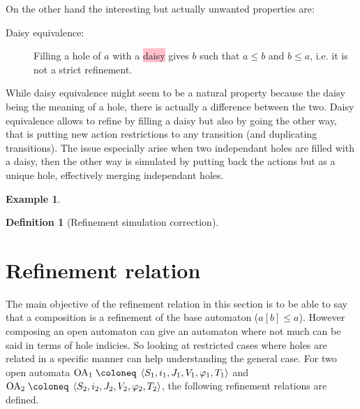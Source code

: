 \documentclass{article}
\theoremstyle{plain}
\theoremstyle{definition}
\newtheorem{defi}{Definition}
\newtheorem{exi}{Example}
\newcommand\comment[3]{\colorbox{#1}{#2}\marginpar{#3}}
\newcommand\Quentin{\comment{pink}}
\newcommand\mbrk[1]{{\left[#1\right]}}
\newcommand\defobject{\DOTSB\;{\coloneq}\;}
\newcommand\OA[6]{\left<#1,#2,#3,#4,#5,#6\right>}
\begin{document}
On the other hand the interesting but actually unwanted properties are:
\begin{description}
\item[Daisy equivalence:] Filling a hole of \(a\) with a \Quentin{daisy}{How is it called in english?} gives \(b\) such that \(a \leq b\) and \(b \leq a\), i.e. it is not a strict refinement.
\end{description}
While daisy equivalence might seem to be a natural property because the daisy being the meaning of a hole, there is actually a difference between the two.
Daisy equivalence allows to refine by filling a daisy but also by going the other way, that is putting new action restrictions to any transition (and duplicating transitions).
The issue especially arise when two independant holes are filled with a daisy, then the other way is simulated by putting back the actions but as a unique hole, effectively merging independant holes.
\begin{exi}
\end{exi}

\begin{defi}[Refinement simulation correction] %
\end{defi}


\section{Refinement relation}
The main objective of the refinement relation in this section is to be able to say that a composition is a refinement of the base automaton (\(a\mbrk{b} \leq a\)).
However composing an open automaton can give an automaton where not much can be said in terms of hole indicies.
So looking at restricted cases where holes are related in a specific manner can help understanding the general case.
For two open automata \(\mathrm{OA}_1 \defobject \OA{S_1}{i_1}{J_1}{V_1}{\varphi_1}{T_1}\) and \(\mathrm{OA}_2 \defobject \OA{S_2}{i_2}{J_2}{V_2}{\varphi_2}{T_2}\), the following refinement relations are defined.
\end{document}
